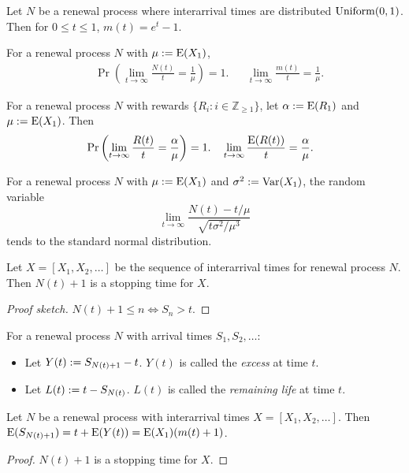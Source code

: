 \documentclass[a4paper, 12pt, fleqn]{article}
\begin{document}
\begin{corollary}
Let $N$ be a renewal process where interarrival times are distributed $\operatorname{Uniform}(0, 1)$.
Then for $0 \le t \le 1$, $m(t) = e^t - 1$.
\end{corollary}

\begin{theorem}
For a renewal process $N$ with $\mu := \operatorname*{E}(X_1)$,
\begin{align*}
& \Pr\left(\lim_{t \to \infty} \frac{N(t)}{t} = \frac{1}{\mu}\right) = 1.
&& \lim_{t \to \infty} \frac{m(t)}{t} = \frac{1}{\mu}.
\end{align*}
\end{theorem}

\begin{theorem}
For a renewal process $N$ with rewards $\{R_i: i \in \mathbb{Z}_{\ge 1}\}$,
let $\alpha := \operatorname*{E}(R_1)$ and $\mu := \operatorname*{E}(X_1)$. Then
\begin{align*}
& \Pr\left(\lim_{t \to \infty} \frac{R(t)}{t} = \frac{\alpha}{\mu}\right) = 1.
&& \lim_{t \to \infty} \frac{\operatorname*{E}(R(t))}{t} = \frac{\alpha}{\mu}.
\end{align*}
\end{theorem}

\begin{theorem}
For a renewal process $N$ with $\mu := \operatorname*{E}(X_1)$ and $\sigma^2 := \operatorname*{Var}(X_1)$,
the random variable
\[ \lim_{t \to \infty} \frac{N(t) - t/\mu}{\sqrt{t\sigma^2/\mu^3}} \]
tends to the standard normal distribution.
\end{theorem}

\begin{lemma}
Let $X = [X_1, X_2, \ldots]$ be the sequence of interarrival times for renewal process $N$.
Then $N(t)+1$ is a stopping time for $X$.
\end{lemma}
\begin{proof}[Proof sketch]
$N(t)+1 \le n \iff S_n > t$.
\end{proof}

\begin{definition}
For a renewal process $N$ with arrival times $S_1, S_2, \ldots$:
\begin{itemize}
\item Let $Y(t) := S_{N(t)+1}-t$. $Y(t)$ is called the \emph{excess} at time $t$.
\item Let $L(t) := t - S_{N(t)}$. $L(t)$ is called the \emph{remaining life} at time $t$.
\end{itemize}
\end{definition}

\begin{lemma}
Let $N$ be a renewal process with interarrival times $X = [X_1, X_2, \ldots]$.
Then $\operatorname*{E}(S_{N(t)+1}) = t + \operatorname*{E}(Y(t)) = \operatorname*{E}(X_1)(m(t)+1)$.
\end{lemma}
\begin{proof}
$N(t)+1$ is a stopping time for $X$.
\end{proof}
\end{document}
